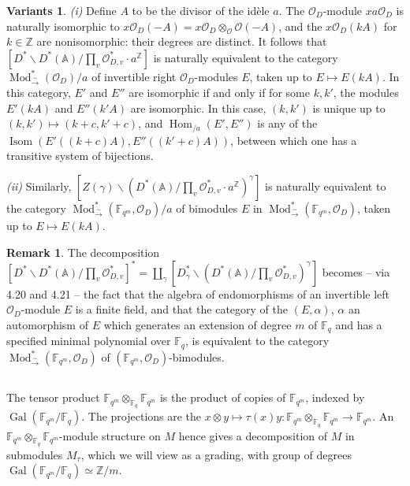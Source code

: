 \documentclass[11pt,a4paper]{article}
\theoremstyle{plain}
\theoremstyle{definition}
\newtheorem{remark}[theorem]{Remark}
\newtheorem{variants}[theorem]{Variants}
\DeclareMathOperator{\Hom}{Hom}
\DeclareMathOperator{\Gal}{Gal}
\DeclareMathOperator{\Mod}{Mod}
\DeclareMathOperator{\Isom}{Isom}
\newcommand{\Fq}{\mathbb{F}_q}
\newcommand{\F}{\mathbb{F}}
\newcommand{\Z}{\mathbb{Z}}
\newcommand{\isom}{\xrightarrow{\sim}}
\begin{document}
\begin{variants}
\emph{(i)} Define $A$ to be the divisor of the id\`ele $a$. The $\mathcal{O}_D$-module $x a \mathcal{O}_D$ is naturally isomorphic to $x \mathcal{O}_D(-A) = x \mathcal{O}_D \otimes_{\mathcal{O}} \mathcal{O}(-A)$, and the $x \mathcal{O}_D(kA)$ for $k \in \Z$ are nonisomorphic: their degrees are distinct. It follows that $[D^* \backslash D^*(\mathbb{A}) / \prod_v \mathcal{O}_{D,v}^* \cdot a^{\Z}]$ is naturally equivalent to the category $\Mod^*_{\isom}(\mathcal{O}_D)/a$ of invertible right $\mathcal{O}_D$-modules $E$, taken up to $E \mapsto E(kA)$. In this category, $E'$ and $E''$ are isomorphic if and only if for some $k, k'$, the modules $E'(kA)$ and $E''(k'A)$ are isomorphic. In this case, $(k,k')$ is unique up to $(k,k') \mapsto (k+c, k'+c)$, and $\Hom_{/a}(E', E'')$ is any of the $\Isom(E'((k+c)A), E''((k'+c)A))$, between which one has a transitive system of bijections.

\emph{(ii)} Similarly, $[Z(\gamma) \backslash (D^*(\mathbb{A}) / \prod_v \mathcal{O}_{D,v}^* \cdot a^{\Z})^\gamma]$ is naturally equivalent to the category $\Mod^*_{\isom}(\F_{q^m}, \mathcal{O}_D)/a$ of bimodules $E$ in $\Mod^*_{\isom}(\F_{q^m}, \mathcal{O}_D)$, taken up to $E \mapsto E(kA)$.
\end{variants}

\begin{remark}
The decomposition $[D^* \backslash D^*(\mathbb{A}) / \prod_v \mathcal{O}_{D,v}^*]^* = \coprod_\gamma [D_\gamma^* \backslash (D^*(\mathbb{A}) / \prod_v \mathcal{O}_{D,v}^*)^\gamma]$ becomes -- via 4.20 and 4.21 -- the fact that the algebra of endomorphisms of an invertible left $\mathcal{O}_D$-module $E$ is a finite field, and that the category of the $(E, \alpha)$, $\alpha$ an automorphism of $E$ which generates an extension of degree $m$ of $\Fq$ and has a specified minimal polynomial over $\Fq$, is equivalent to the category $\Mod^*_{\isom}(\F_{q^m}, \mathcal{O}_D)$ of $(\F_{q^m}, \mathcal{O}_D)$-bimodules.
\end{remark}

\subsection{}

The tensor product $\F_{q^m} \otimes_{\Fq} \F_{q^m}$ is the product of copies of $\F_{q^m}$, indexed by $\Gal(\F_{q^m}/\Fq)$. The projections are the $x \otimes y \mapsto \tau(x)y: \F_{q^m} \otimes_{\Fq} \F_{q^m} \to \F_{q^m}$. An $\F_{q^m} \otimes_{\Fq} \F_{q^m}$-module structure on $M$ hence gives a decomposition of $M$ in submodules $M_\tau$, which we will view as a grading, with group of degrees $\Gal(\F_{q^m}/\Fq) \simeq \Z/m$.
\end{document}
